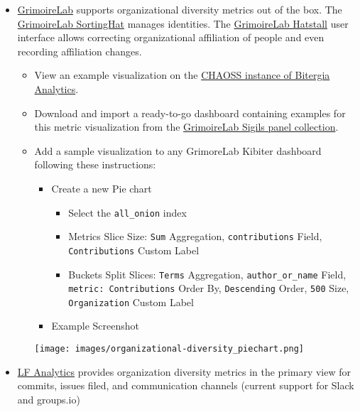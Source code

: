 \documentclass[
  12pt,
]{article}
\providecommand{\tightlist}{%
  \setlength{\itemsep}{0pt}\setlength{\parskip}{0pt}}
\begin{document}
\begin{itemize}
\tightlist
\item
  \href{https://chaoss.github.io/grimoirelab}{GrimoireLab} supports
  organizational diversity metrics out of the box. The
  \href{https://github.com/chaoss/grimoirelab-sortinghat}{GrimoireLab
  SortingHat} manages identities. The
  \href{https://github.com/chaoss/grimoirelab-hatstall}{GrimoireLab
  Hatstall} user interface allows correcting organizational affiliation
  of people and even recording affiliation changes.

  \begin{itemize}
  \tightlist
  \item
    View an example visualization on the
    \href{https://chaoss.biterg.io/app/kibana\#/dashboard/Community-Structure-by-Organization}{CHAOSS
    instance of Bitergia Analytics}.
  \item
    Download and import a ready-to-go dashboard containing examples for
    this metric visualization from the
    \href{https://chaoss.github.io/grimoirelab-sigils/panels/community-structure-by-organization/}{GrimoireLab
    Sigils panel collection}.
  \item
    Add a sample visualization to any GrimoreLab Kibiter dashboard
    following these instructions:

    \begin{itemize}
    \tightlist
    \item
      Create a new Pie chart

      \begin{itemize}
      \tightlist
      \item
        Select the \texttt{all\_onion} index
      \item
        Metrics Slice Size: \texttt{Sum} Aggregation,
        \texttt{contributions} Field, \texttt{Contributions} Custom
        Label
      \item
        Buckets Split Slices: \texttt{Terms} Aggregation,
        \texttt{author\_or\_name} Field, \texttt{metric:\ Contributions}
        Order By, \texttt{Descending} Order, \texttt{500} Size,
        \texttt{Organization} Custom Label
      \end{itemize}
    \item
      Example Screenshot
    \end{itemize}

    \texttt{[image: images/organizational-diversity\_piechart.png]}
  \end{itemize}
\item
  \href{https://lfanalytics.io}{LF Analytics} provides organization
  diversity metrics in the primary view for commits, issues filed, and
  communication channels (current support for Slack and groups.io)
\end{itemize}
\end{document}

